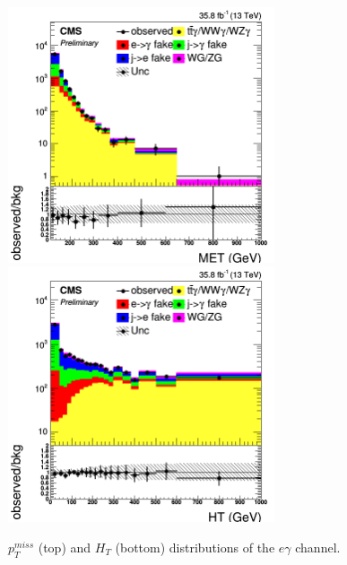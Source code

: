 \documentclass[thesis.tex]{subfiles}
\renewcommand\_{\textunderscore\allowbreak}
\begin{document}
\begin{figure}[hbtp]
  \centering
    \includegraphics[width=0.7\textwidth]{Figures/VALID_egamma_2016ReMiniAOD_met_TT.png} \\
    \includegraphics[width=0.7\textwidth]{Figures/VALID_egamma_2016ReMiniAOD_ht_TT.png}
  \caption{$p_T^{miss}$ (top) and $H_T$ (bottom) distributions of the $e\gamma$ channel.}
    \label{fig:ttgvalidationeg}
\end{figure}
\end{document}
